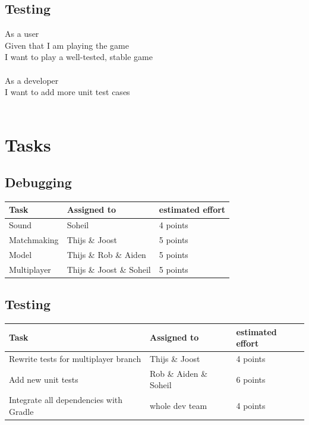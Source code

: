 \documentclass{article}
\begin{document}
\subsection*{Testing}
As a user\\
Given that I am playing the game\\
I want to play a well-tested, stable game\\\\
As a developer\\
I want to add more unit test cases\\\\
\section*{Tasks}
\subsection*{Debugging}
\begin{tabular}{ | l | l | l | }
\hline
\textbf{Task} & \textbf{Assigned to} & \textbf{estimated effort} \\ \hline
Sound & Soheil & 4 points \\ \hline
Matchmaking & Thijs \& Joost & 5 points \\\hline
Model & Thijs \& Rob \& Aiden  & 5 points \\ \hline
Multiplayer & Thijs \& Joost \& Soheil & 5 points \\ \hline
\end{tabular} \newline
\subsection*{Testing}
\begin{tabular}{ | l | l | l | }
\hline
\textbf{Task} & \textbf{Assigned to} & \textbf{estimated effort} \\ \hline
Rewrite tests for multiplayer branch & Thijs \& Joost & 4 points \\ \hline
Add new unit tests & Rob \& Aiden \& Soheil & 6 points \\\hline
Integrate all dependencies with Gradle & whole dev team & 4 points \\ \hline
\end{tabular} \newline
\newline \\
\end{document}
